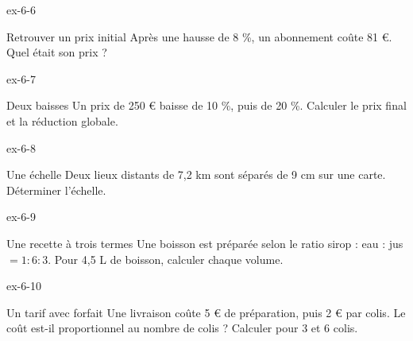 \clearpage{}
\begin{blocLivre}{ex-6-6}\begin{exercice}[2]{Retrouver un prix initial}
Après une hausse de 8 \%, un abonnement coûte 81 €. Quel était son prix ?
\end{exercice}\end{blocLivre}
\begin{blocLivre}{ex-6-7}\begin{exercice}[2]{Deux baisses}
Un prix de 250 € baisse de 10 \%, puis de 20 \%. Calculer le prix final et la réduction globale.
\end{exercice}\end{blocLivre}
\begin{blocLivre}{ex-6-8}\begin{exercice}[2]{Une échelle}
Deux lieux distants de 7,2 km sont séparés de 9 cm sur une carte. Déterminer l’échelle.
\end{exercice}\end{blocLivre}
\begin{blocLivre}{ex-6-9}\begin{exercice}[2]{Une recette à trois termes}
Une boisson est préparée selon le ratio sirop : eau : jus $=1:6:3$. Pour 4,5 L de boisson, calculer chaque volume.
\end{exercice}\end{blocLivre}
\begin{blocLivre}{ex-6-10}\begin{exercice}[2]{Un tarif avec forfait}
Une livraison coûte 5 € de préparation, puis 2 € par colis. Le coût est-il proportionnel au nombre de colis ? Calculer pour 3 et 6 colis.
\end{exercice}\end{blocLivre}

